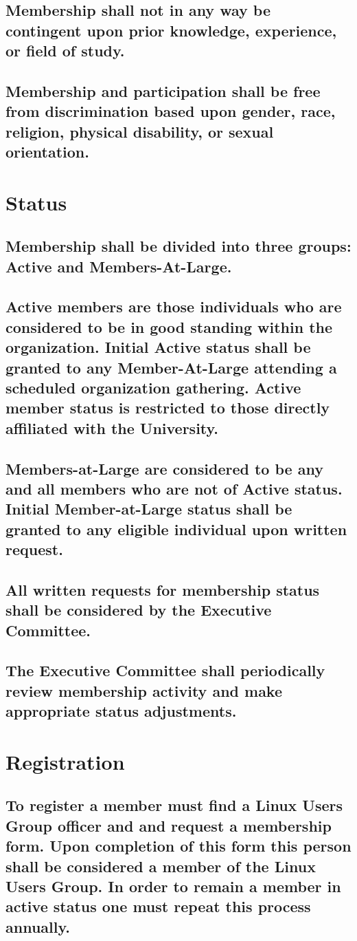 \documentclass[letter]{report}
\begin{document}
\subsection{Membership shall not in any way be contingent upon prior knowledge, experience, or field of study.}
\subsection{Membership and participation shall be free from discrimination based upon gender, race, religion, physical disability, or sexual orientation.}
\section{Status}
\subsection{Membership shall be divided into three groups: Active and Members-At-Large.}
\subsection{Active members are those individuals who are considered to be in good standing within the organization. Initial Active status shall be granted to any Member-At-Large attending a scheduled organization gathering. Active member status is restricted to those directly affiliated with the University.
}
\subsection{Members-at-Large are considered to be any and all members who are not of Active status. Initial Member-at-Large status shall be granted to any eligible individual upon written request.
}
\subsection{All written requests for membership status shall be considered by the Executive Committee.}
\subsection{The Executive Committee shall periodically review membership activity and make appropriate status adjustments.}
\section{Registration}
\subsection{To register a member must find a Linux Users Group officer and and request a membership form. Upon completion of this form this person shall be considered a member of the Linux Users Group. In order to remain a member in active status one must repeat this process annually.}
\end{document}
